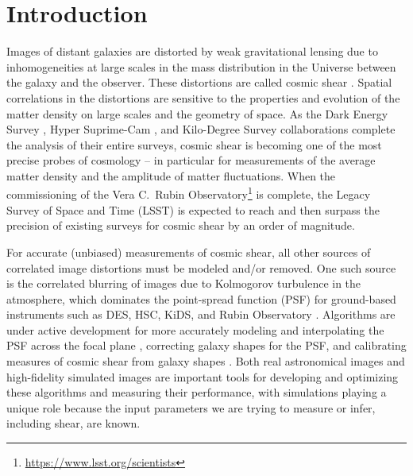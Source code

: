 \documentclass[twocolumn,twocolappendix]{openjournal}
\begin{document}
\section{Introduction} \label{sec:intro}

Images of distant galaxies are distorted by weak gravitational lensing due to inhomogeneities at large scales in the mass distribution in the Universe between the galaxy and the observer.  
These distortions are called cosmic shear \citep[see, \eg,][]{kilbinger_cosmology_2015, mandelbaum_weak_2018}. 
Spatial correlations in the distortions are sensitive to the properties and evolution of the matter density on large scales and the geometry of space.  
As the Dark Energy Survey \citep[DES\footnote{\url{https://www.darkenergysurvey.org/}},][]{amon_dark_2022, secco_dark_2022}, Hyper Suprime-Cam \citep[HSC\footnote{\url{https://hsc.mtk.nao.ac.jp/ssp/}},][]{li_hyper_2023, dalal_hyper_2023}, and Kilo-Degree Survey \citep[KiDS\footnote{\url{http://kids.strw.leidenuniv.nl/}},][]{asgari_kids-1000_2021} collaborations complete the analysis of their entire surveys, cosmic shear is becoming one of the most precise probes of cosmology -- in particular for measurements of the average matter density and the amplitude of matter fluctuations.
When the commissioning of the Vera C.~Rubin Observatory\footnote{\url{https://www.lsst.org/scientists}} is complete, the Legacy Survey of Space and Time (LSST) is expected to reach and then surpass the precision of existing surveys for cosmic shear by an order of magnitude. 

For accurate (unbiased) measurements of cosmic shear, all other sources of correlated image distortions must be modeled and/or removed. 
One such source is the correlated blurring of images due to Kolmogorov turbulence in the atmosphere, which dominates the point-spread function (PSF) for ground-based instruments such as DES, HSC, KiDS, and Rubin Observatory \citep[\eg,][]{heymans_impact_2012,jarvis_science_2016, xin_study_2018}. 
Algorithms are under active development for more accurately modeling and interpolating the PSF across the focal plane \citep[see, \eg,][]{bertin_automated_2011, jarvis_dark_2020}, correcting galaxy shapes for the PSF, and calibrating measures of cosmic shear from galaxy shapes \citep{sheldon_practical_2017, huff_metacalibration_2017, gatti_dark_2021, sheldon_metadetection_2023}.  
Both real astronomical images and high-fidelity simulated images are important tools for developing and optimizing these algorithms and measuring their performance, with simulations playing a unique role because the input parameters we are trying to measure or infer, including shear, are known.  
\end{document}
